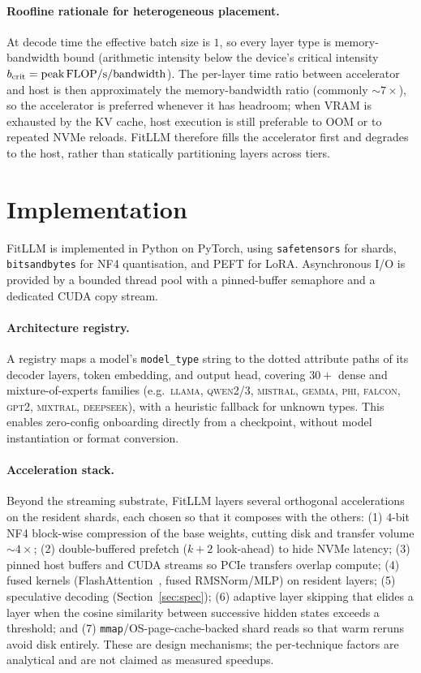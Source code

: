 \documentclass{article}
\begin{document}
\paragraph{Roofline rationale for heterogeneous placement.}
At decode time the effective batch size is $1$, so every layer type is
memory-bandwidth bound (arithmetic intensity below the device's critical
intensity $b_{\mathrm{crit}}=\text{peak\,FLOP/s}/\text{bandwidth}$). The per-layer
time ratio between accelerator and host is then approximately the
memory-bandwidth ratio (commonly $\sim$$7\times$), so the accelerator is preferred
whenever it has headroom; when VRAM is exhausted by the KV cache, host execution
is still preferable to OOM or to repeated NVMe reloads. FitLLM therefore fills the
accelerator first and degrades to the host, rather than statically partitioning
layers across tiers.

\section{Implementation}
\label{sec:impl}

FitLLM is implemented in Python on PyTorch, using \texttt{safetensors} for
shards, \texttt{bitsandbytes} for NF4 quantisation, and PEFT for LoRA.
Asynchronous I/O is provided by a bounded thread pool with a pinned-buffer
semaphore and a dedicated CUDA copy stream.

\paragraph{Architecture registry.} A registry maps a model's \texttt{model\_type}
string to the dotted attribute paths of its decoder layers, token embedding, and
output head, covering $30{+}$ dense and mixture-of-experts families
(e.g.\ \textsc{llama}, \textsc{qwen2/3}, \textsc{mistral}, \textsc{gemma},
\textsc{phi}, \textsc{falcon}, \textsc{gpt2}, \textsc{mixtral},
\textsc{deepseek}), with a heuristic fallback for unknown types. This enables
zero-config onboarding directly from a checkpoint, without model instantiation
or format conversion.

\paragraph{Acceleration stack.} Beyond the streaming substrate, FitLLM layers
several orthogonal accelerations on the resident shards, each chosen so that it
composes with the others: (1) $4$-bit NF4 block-wise compression of the base
weights, cutting disk and transfer volume $\sim$$4\times$; (2) double-buffered
prefetch ($k{+}2$ look-ahead) to hide NVMe latency; (3) pinned host buffers and
CUDA streams so PCIe transfers overlap compute; (4) fused kernels
(FlashAttention~\citep{dao2022flashattention}, fused RMSNorm/MLP) on resident
layers; (5) speculative decoding (Section~\ref{sec:spec}); (6) adaptive layer
skipping that elides a layer when the cosine similarity between successive hidden
states exceeds a threshold; and (7) \texttt{mmap}/OS-page-cache-backed shard
reads so that warm reruns avoid disk entirely. These are design mechanisms; the
per-technique factors are analytical and are not claimed as measured speedups.
\end{document}
